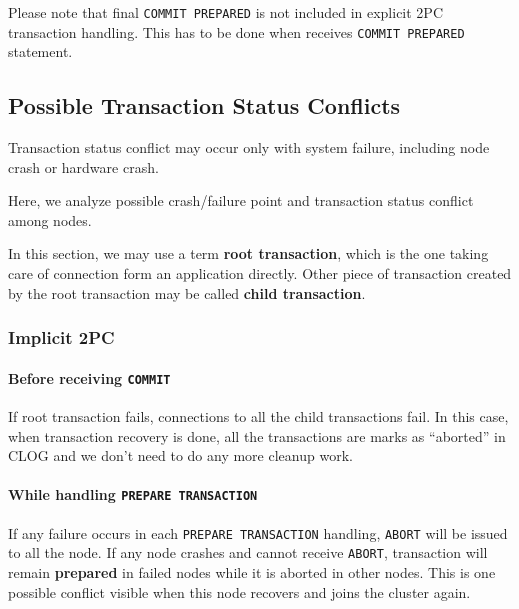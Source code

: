   Please note that final {\tt COMMIT PREPARED} is not included in explicit 2PC transaction handling.
  This has to be done when \XC{} receives {\tt COMMIT PREPARED} statement.



\subsection{Possible Transaction Status Conflicts}

  Transaction status conflict may occur only with system failure, including node crash or
  hardware crash.
  
  Here, we analyze possible crash/failure point and transaction status conflict among nodes.
  
  In this section, we may use a term {\bf root transaction}, which is the one taking care of
  connection form an application directly.
  Other piece of transaction created by the root transaction may be called {\bf child transaction}.



\subsubsection{Implicit 2PC}

  \paragraph*{Before receiving \texttt{COMMIT}}
  
    If root transaction fails, connections to all the child transactions fail.
    In this case, when transaction recovery is done, all the transactions are
    marks as ``aborted'' in CLOG and we don't need to do any more cleanup work.
  
  \paragraph*{While handling \texttt{PREPARE TRANSACTION}}
  
    If any failure occurs in each \texttt{PREPARE TRANSACTION} handling, \texttt{ABORT} will be issued to all the node.
    If any node crashes and cannot receive \texttt{ABORT}, transaction will remain {\bf prepared} in failed nodes
    while it is aborted in other nodes.
    This is one possible conflict visible when this node recovers and joins the cluster again.
  
